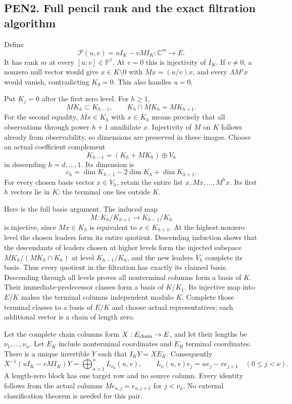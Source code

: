 \documentclass[11pt]{article}
\begin{document}
\subsection{PEN2. Full pencil rank and the exact filtration algorithm}\label{pen2.-full-pencil-rank-and-the-exact-filtration-algorithm}

Define \[
\mathcal P(u,v)=uI_K-vMI_K:\mathbb C^m\longrightarrow E.
\] It has rank \(m\) at every \([u:v]\in\mathbb P^1\). At \(v=0\) this is injectivity of \(I_K\). If \(v\ne0\), a nonzero null vector would give \(x\in K\setminus0\) with \(Mx=(u/v)x\), and every \(\Lambda M^j x\) would vanish, contradicting \(K_d=0\). This also handles \(u=0\).

Put \(K_j=0\) after the first zero level. For \(h\ge1\), \[
MK_h\subset K_{h-1},\qquad K_h\cap MK_h=MK_{h+1}. \tag{PEN3}
\] For the second equality, \(Mx\in K_h\) with \(x\in K_h\) means precisely that all observations through power \(h+1\) annihilate \(x\). Injectivity of \(M\) on \(K\) follows already from observability, so dimensions are preserved in these images. Choose an actual coefficient complement \[
K_{h-1}=(K_h+MK_h)\oplus V_h
\] in descending \(h=d,\ldots,1\). Its dimension is \[
c_h=\dim K_{h-1}-2\dim K_h+\dim K_{h+1}.
\] For every chosen basis vector \(x\in V_h\), retain the entire list \(x,Mx,\ldots,M^h x\). Its first \(h\) vectors lie in \(K\); the terminal one lies outside \(K\).

Here is the full basis argument. The induced map \[
M:K_h/K_{h+1}\longrightarrow K_{h-1}/K_h
\] is injective, since \(Mx\in K_h\) is equivalent to \(x\in K_{h+1}\). At the highest nonzero level the chosen leaders form its entire quotient. Descending induction shows that the descendants of leaders chosen at higher levels form the injected subspace \(MK_h/(MK_h\cap K_h)\) at level \(K_{h-1}/K_h\), and the new leaders \(V_h\) complete its basis. Thus every quotient in the filtration has exactly its claimed basis. Descending through all levels proves all nonterminal columns form a basis of \(K\). Their immediate-predecessor classes form a basis of \(K/K_1\). Its injective map into \(E/K\) makes the terminal columns independent modulo \(K\). Complete those terminal classes to a basis of \(E/K\) and choose actual representatives; each additional vector is a chain of length zero.

Let the complete chain columns form \(X:E_{\rm chain}\to E\), and let their lengths be \(\nu_1,\ldots,\nu_n\). Let \(E_K\) include nonterminal coordinates and \(E_B\) terminal coordinates. There is a unique invertible \(Y\) such that \(I_KY=XE_K\). Consequently \[
X^{-1}(uI_K-vMI_K)Y=\bigoplus_{a=1}^n L_{\nu_a}(u,v),\qquad
L_\nu(u,v)e_j=ue_j-ve_{j+1}\quad(0\le j<\nu). \tag{PEN4}
\] A length-zero block has one target row and no source column. Every identity follows from the actual columns \(Me_{a,j}=e_{a,j+1}\) for \(j<\nu_a\). No external classification theorem is needed for this pair.
\end{document}
